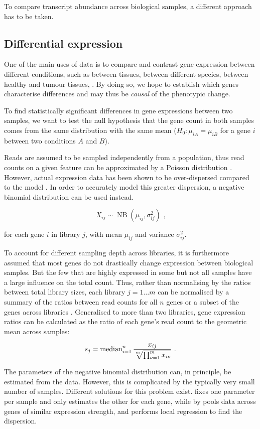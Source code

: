 To compare transcript abundance across biological samples, a different approach
has to be taken.

\subsection{Differential expression}

One of the main uses of \rnaseq data is to compare and contrast gene expression
between different conditions, such as between tissues, between different
species, between healthy and tumour tissues, \etc. By doing so, we hope to
establish which genes characterise differences and may thus be \emph{causal} of
the phenotypic change.

To find statistically significant differences in gene expressions between two
samples, we want to test the null hypothesis that the gene count in both samples
comes from the same distribution with the same mean (\(H_0: \mu_{iA} =
\mu_{iB}\) for a gene \(i\) between two conditions \(A\) and \(B\)).

Reads are assumed to be sampled independently from a population, thus read
counts on a given feature can be approximated by a Poisson distribution
\citep{Mortazavi:2008, Marioni:2008}. However, actual expression data has been
shown to be over-dispersed compared to the model \citep{Robinson:2007}. In order
to accurately model this greater dispersion, a negative binomial distribution
can be used instead.

\begin{equation}
    X_{ij} \sim \operatorname{NB}(\mu_{ij}, \sigma^2_{ij}) \text{\ ,}
\end{equation}

for each gene \(i\) in library \(j\), with mean \(\mu_{ij}\) and variance
\(\sigma^2_{ij}\).

To account for different sampling depth across libraries, it is furthermore
assumed that most genes do not drastically change expression between biological
samples. But the few that are highly expressed in some but not all samples have
a large influence on the total count. Thus, rather than normalising by the
ratios between total library sizes, each library \(j = 1 \dots m\) can be
normalised by a summary of the ratios between read counts for all \(n\) genes or
a subset of the genes across libraries \citep{Robinson:2010a,Anders:2010}.
Generalised to more than two libraries, gene expression ratios can be calculated
as the ratio of each gene’s read count to the geometric mean across samples:

\begin{equation}
    s_j = \operatorname{median}_{i = 1}^n
        \frac{x_{ij}}{\sqrt[\uproot{2}m]{\prod_{\nu = 1}^m x_{i\nu}}}
        \text{\ .}
\end{equation}

The parameters of the negative binomial distribution can, in principle, be
estimated from the data. However, this is complicated by the typically very
small number of samples. Different solutions for this problem exist.
 \citep{Robinson:2010} fixes one parameter per sample and only
estimates the other for each gene, while  by \citet{Anders:2010}
pools data across genes of similar expression strength, and performs local
regression to find the dispersion.
